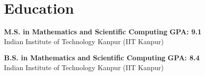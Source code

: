 \documentclass[10pt, letterpaper]{article}
\begin{document}
\section*{Education}

\noindent
\textbf{M.S. in Mathematics and Scientific Computing} \hfill \textbf{GPA: 9.1} \\
Indian Institute of Technology Kanpur (IIT Kanpur) \hfill \\

\vspace{1ex}

\noindent
\textbf{B.S. in Mathematics and Scientific Computing} \hfill \textbf{GPA: 8.4}\\
Indian Institute of Technology Kanpur (IIT Kanpur) \hfill
\end{document}
